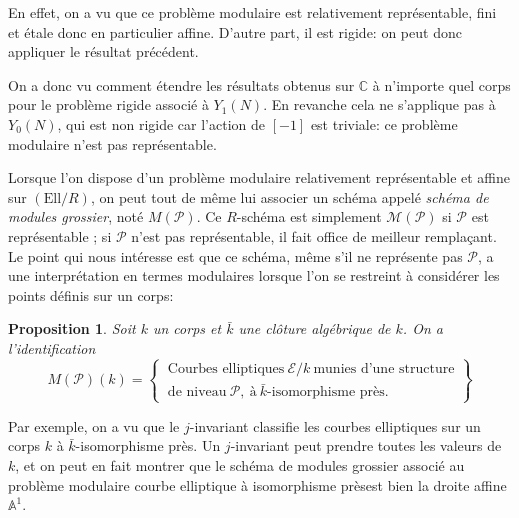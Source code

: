 \documentclass[11pt,a4paper]{article}
\newcommand{\C}{\mathbb{C}}
\newcommand{\A}{\mathbb{A}}
\newcommand{\E}{\mathcal{E}}
\renewcommand{\Pr}{\mathcal{P}}
\newcommand{\M}{\mathcal{M}}
\newcommand{\Ell}{\mathrm{Ell}}
\renewcommand{\v}{\vspace{5mm}}
\newtheorem*{prop}{Proposition}
\theoremstyle{definition}
\begin{document}
En effet, on a vu que ce problème modulaire est relativement représentable, fini et étale donc en particulier affine. D'autre part, il est rigide: on peut donc appliquer le résultat précédent.

On a donc vu comment étendre les résultats obtenus sur $\C$ à n'importe quel corps pour le problème rigide associé à $Y_1(N)$. En revanche cela ne s'applique pas à $Y_0(N)$, qui est non rigide car l'action de $[-1]$ est triviale: ce problème modulaire n'est pas représentable. 

\v

Lorsque l'on dispose d'un problème modulaire relativement représentable et affine sur $(\Ell/R)$, on peut tout de même lui associer un schéma appelé \emph{schéma de modules grossier}, noté $M(\Pr)$. Ce $R$-schéma est simplement $\M(\Pr)$ si $\Pr$ est représentable ; si $\Pr$ n'est pas représentable, il fait office de meilleur remplaçant. Le point qui nous intéresse est que ce schéma, même s'il ne représente pas $\Pr$, a une interprétation en termes modulaires lorsque l'on se restreint à considérer les points définis sur un corps:

\begin{prop}
Soit $k$ un corps et $\bar{k}$ une clôture algébrique de $k$. On a l'identification
$$ M(\Pr)(k) = 
\left.
\begin{cases}
\ \text{Courbes\ elliptiques}\ \E/k \ \text{munies\ d'une\ structure} \\
\ \text{de\ niveau}\ \Pr,\ \text{à}\ \bar{k}\text{-isomorphisme\ près}.
\end{cases}
\right\}$$
\end{prop}

Par exemple, on a vu que le $j$-invariant classifie les courbes elliptiques sur un corps $k$ à $\bar{k}$-isomorphisme près. Un $j$-invariant peut prendre toutes les valeurs de $k$, et on peut en fait montrer que le schéma de modules grossier associé au problème modulaire \og courbe elliptique à isomorphisme près\fg est bien la droite affine $\A^1$.
\end{document}
